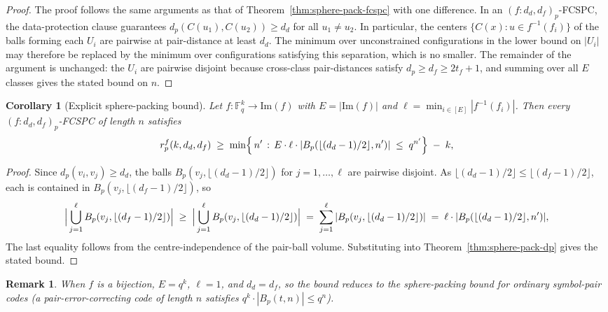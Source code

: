 \documentclass[11pt,draftclsnofoot,journal,onecolumn]{IEEEtran}
\newtheorem{corollary}{Corollary}
\newtheorem{remark}{Remark}
\begin{document}
    \begin{proof}
    The proof follows the same arguments as that of Theorem~\ref{thm:sphere-pack-fcspc} with one difference. In an $(f : d_d, d_f)_p$-FCSPC, the data-protection clause guarantees $d_p(C(u_1), C(u_2)) \ge d_d$ for all $u_1 \ne u_2$. In particular, the centers $\{C(x) : u \in f^{-1}(f_i)\}$ of the balls forming each $U_i$ are pairwise at pair-distance at least $d_d$. The minimum over unconstrained configurations in the lower bound on $|U_i|$ may therefore be replaced by the minimum over configurations satisfying this separation, which is no smaller. The remainder of the argument is unchanged: the $U_i$ are pairwise disjoint because cross-class pair-distances satisfy $d_p \ge d_f \ge 2t_f + 1$, and summing over all $E$ classes gives the stated bound on $n$.
    \end{proof}



    \begin{corollary}[Explicit sphere-packing bound]\label{cor:sphere-pack-explicit}
    Let $f : \mathbb{F}_q^k \to \mathrm{Im}(f)$ with $E = |\mathrm{Im}(f)|$ and $\ell = \min_{i \in [E]} |f^{-1}(f_i)|$. Then every $(f : d_d, d_f)_p$-FCSPC of length $n$ satisfies
    \[
    r_p^f(k, d_d, d_f) \;\ge\; \min\Bigl\{\, n' \,:\,
    E \cdot \ell \cdot |B_p(\lfloor (d_d - 1)/2 \rfloor, n')| \;\le\; q^{n'} \Bigr\} \;-\; k,
    \]
    \end{corollary}

    \begin{proof}
    Since $d_p(v_i, v_j) \ge d_d$, the balls $B_p(v_j, \lfloor (d_d - 1)/2 \rfloor)$ for $j = 1, \dots, \ell$ are pairwise disjoint. As $\lfloor (d_d - 1)/2 \rfloor \le \lfloor (d_f - 1)/2 \rfloor$,
    each is contained in $B_p(v_j, \lfloor (d_f - 1)/2 \rfloor)$, so
    \[
    \Bigl|\,\bigcup_{j=1}^{\ell} B_p(v_j, \lfloor (d_f - 1)/2 \rfloor)\Bigr|
    \;\ge\;
    \Bigl|\,\bigcup_{j=1}^{\ell} B_p(v_j, \lfloor (d_d - 1)/2 \rfloor)\Bigr|
    \;=\;
    \sum_{j=1}^{\ell} |B_p(v_j, \lfloor (d_d - 1)/2 \rfloor)|
    \;=\;
    \ell \cdot |B_p(\lfloor (d_d - 1)/2 \rfloor, n')|,
    \]
    The last equality follows from the centre-independence of the pair-ball volume. Substituting into Theorem~\ref{thm:sphere-pack-dp} gives the stated bound.
    \end{proof}

    \begin{remark}
    When $f$ is a bijection, $E = q^k$, $\ell = 1$, and $d_d = d_f$, so the bound
    reduces to the sphere-packing bound for ordinary symbol-pair codes \cite[Prop.~18]{cassuto2011codes} (a pair-error-correcting code of length $n$ satisfies $q^k \cdot |B_p(t, n)| \le q^n$).
    \end{remark}
\end{document}
